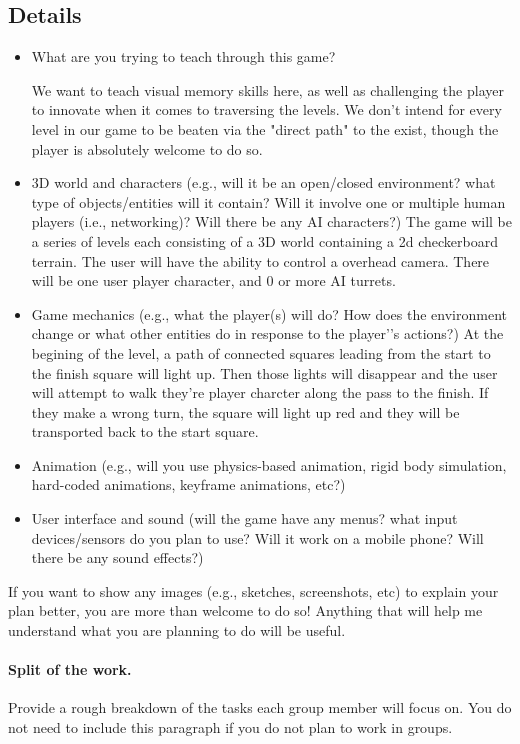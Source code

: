 \documentclass[11pt]{article}
\begin{document}
\subsection{Details}
\begin{itemize}
\item What are you trying to teach through this game?

We want to teach visual memory skills here, as well as challenging the player to innovate when it comes to traversing the levels. We don't intend for every level in our game to be beaten via the "direct path" to the exist, though the player is absolutely welcome to do so.

\item 3D world and characters (e.g., will it be an open/closed environment? what type of objects/entities will it contain? Will it involve one or multiple human players (i.e., networking)? Will there be any AI characters?)
The game will be a series of levels each consisting of a 3D world containing a 2d checkerboard terrain. The user will have the ability to control a overhead camera. There will be one user player character, and 0 or more AI turrets. 

\item Game mechanics (e.g., what the player(s) will do? How does the environment change or what other entities do in response to the player’'s actions?)
At the begining of the level, a path of connected squares leading from the start to the finish square will light up. Then those lights will disappear and the user will attempt to walk they're player charcter along the pass to the finish. If they make a wrong turn, the square will light up red and they will be transported back to the start square.  

\item Animation (e.g., will you use physics-based animation, rigid body simulation, hard-coded animations, keyframe animations, etc?)
\item User interface and sound (will the game have any menus? what input devices/sensors do you plan to use? Will it work on a mobile phone? Will there be any sound effects?)
\end{itemize}

If you want to show any images (e.g., sketches, screenshots, etc) to explain your plan better, you are more than welcome to do so! Anything that will help me understand what you are planning to do will be useful.  


\paragraph{Split of the work.}
Provide  a rough breakdown of the tasks each group member will focus on. You do not need to include this paragraph if you do not plan to work in groups. 
\end{document}
